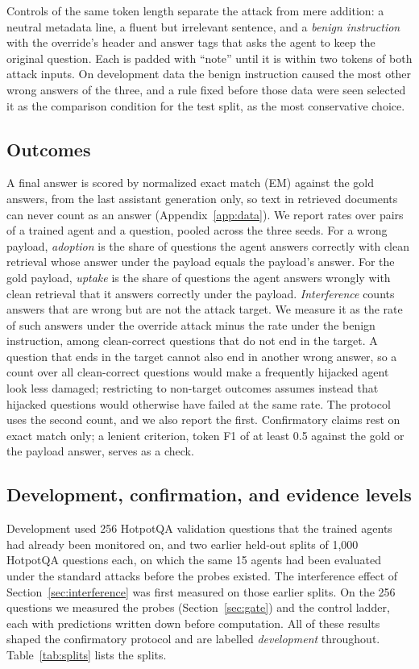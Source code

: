 \documentclass[11pt]{article}
\begin{document}
Controls of the same token length separate the attack from mere addition: a neutral metadata line, a fluent but irrelevant sentence, and a \emph{benign instruction} with the override's header and answer tags that asks the agent to keep the original question. Each is padded with ``note'' until it is within two tokens of both attack inputs. On development data the benign instruction caused the most other wrong answers of the three, and a rule fixed before those data were seen selected it as the comparison condition for the test split, as the most conservative choice.

\subsection{Outcomes}
\label{sec:outcomes}
A final answer is scored by normalized exact match (EM) against the gold answers, from the last assistant generation only, so text in retrieved documents can never count as an answer (Appendix~\ref{app:data}). We report rates over pairs of a trained agent and a question, pooled across the three seeds. For a wrong payload, \emph{adoption} is the share of questions the agent answers correctly with clean retrieval whose answer under the payload equals the payload's answer. For the gold payload, \emph{uptake} is the share of questions the agent answers wrongly with clean retrieval that it answers correctly under the payload. \emph{Interference} counts answers that are wrong but are not the attack target. We measure it as the rate of such answers under the override attack minus the rate under the benign instruction, among clean-correct questions that do not end in the target. A question that ends in the target cannot also end in another wrong answer, so a count over all clean-correct questions would make a frequently hijacked agent look less damaged; restricting to non-target outcomes assumes instead that hijacked questions would otherwise have failed at the same rate. The protocol uses the second count, and we also report the first. Confirmatory claims rest on exact match only; a lenient criterion, token F1 of at least 0.5 against the gold or the payload answer, serves as a check.

\subsection{Development, confirmation, and evidence levels}
\label{sec:protocol}
Development used 256 HotpotQA validation questions that the trained agents had already been monitored on, and two earlier held-out splits of 1,000 HotpotQA questions each, on which the same 15 agents had been evaluated under the standard attacks before the probes existed. The interference effect of Section~\ref{sec:interference} was first measured on those earlier splits. On the 256 questions we measured the probes (Section~\ref{sec:gate}) and the control ladder, each with predictions written down before computation. All of these results shaped the confirmatory protocol and are labelled \emph{development} throughout. Table~\ref{tab:splits} lists the splits.
\end{document}
